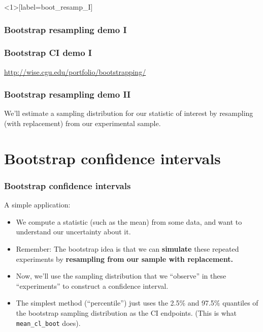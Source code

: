 \documentclass{beamer} %
\begin{document}
\begin{frame}<1>[label=boot_resamp_I]
\frametitle<1>{Bootstrap resampling demo I}
\frametitle<2>{Bootstrap CI demo I}
\centering
\url{http://wise.cgu.edu/portfolio/bootstrapping/}
\end{frame}

\begin{frame}[label=boot_resamp_II]
\frametitle{Bootstrap resampling demo II}
\begin{figure}
\centering
{}
\end{figure}
\end{frame}

\begin{frame}[standout]
We'll estimate a sampling distribution for our statistic of interest by resampling (with replacement) from our experimental sample.
\end{frame}

\section{Bootstrap confidence intervals}

\begin{frame}[fragile]
\frametitle{Bootstrap confidence intervals}
A simple application:
\begin{itemize}[<+(1)->] \itemsep 1em
\item We compute a statistic (such as the mean) from some data, and want to understand our uncertainty about it.
\item Remember: The bootstrap idea is that we can \textbf{simulate} these repeated experiments by \textbf{resampling from our sample with replacement.}
\item Now, we'll use the sampling distribution that we ``observe'' in these ``experiments'' to construct a confidence interval.
\item The simplest method (``percentile'') just uses the 2.5\% and 97.5\% quantiles of the bootstrap sampling distribution as the CI endpoints. (This is what \verb!mean_cl_boot! does).
\end{itemize}
\end{frame}
\end{document}
